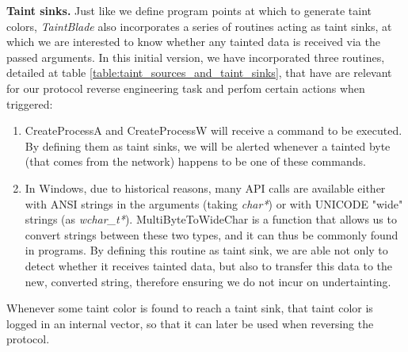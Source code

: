 \documentclass[conference]{IEEEtran}
\begin{document}
\textbf{Taint sinks.} Just like we define program points at which to generate taint colors,
\textit{TaintBlade} also incorporates a series of routines acting as taint sinks,
at which we are interested to know whether any tainted data is received via the passed
arguments. In this initial version, we have incorporated three routines, detailed at
table \ref{table:taint_sources_and_taint_sinks}, that have are relevant for our protocol
reverse engineering task and perfom certain actions when triggered:
\begin{enumerate}
    \item CreateProcessA and CreateProcessW will receive a command to be executed. By
          defining them as taint sinks, we will be alerted whenever a tainted byte (that
          comes from the network) happens to be one of these commands.
    \item In Windows, due to historical reasons, many API calls are available either with
          ANSI strings in the arguments (taking \textit{char*}) or with UNICODE "wide"
          strings (as \textit{wchar\_t*}). MultiByteToWideChar is a function that allows
          us to convert strings between these two types, and it can thus be commonly
          found in programs. By defining this routine as taint sink, we are able not only
          to detect whether it receives tainted data, but also to transfer this data to
          the new, converted string, therefore ensuring we do not incur on undertainting.
\end{enumerate}

Whenever some taint color is found to reach a taint sink, that taint color is logged in an internal
vector, so that it can later be used when reversing the protocol.
\end{document}
